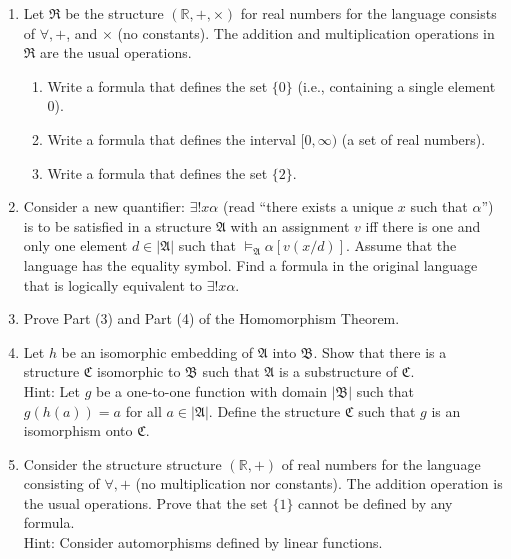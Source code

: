 \documentclass[12pt,letterpaper]{article}
\def\faA{\mathfrak{A}}
\def\faB{\mathfrak{B}}
\def\faC{\mathfrak{C}}
\begin{document}
\begin{enumerate}
\item
  Let $\mathfrak{R}$ be
  the structure $({\mathbb R}, +, \times)$ for real numbers
  for the language consists of $\forall, +$, and $\times$
  (no constants).
  The addition and multiplication operations in $\mathfrak{R}$
  are the usual operations.
  \vspace*{-2mm}
  \begin{enumerate}\itemsep 0pt
  \item
    Write a formula that defines the set $\{0\}$
    (i.e., containing a single element $0$).
  \item
    Write a formula that defines the interval $[0,\infty)$
    (a set of real numbers).
  \item
    Write a formula that defines the set $\{2\}$.
  \end{enumerate}

\item
  Consider a new quantifier: $\exists!x\alpha$
  (read ``there exists a unique $x$ such that $\alpha$'')
  is to be satisfied in a structure $\faA$ with an assignment $v$
  iff there is one and only one element $d\in|\faA|$ such that
  $\models_{\faA}\alpha[v(x/d)]$.
  Assume that the language has the equality symbol.
  Find a formula in the original language that
  is logically equivalent to $\exists!x\alpha$.

\item
  Prove Part (3) and Part (4) of the Homomorphism Theorem.

\item
  Let $h$ be an isomorphic embedding of $\faA$ into $\faB$.
  Show that there is a structure $\faC$ isomorphic to $\faB$
  such that $\faA$ is a substructure of $\faC$.\\
  Hint:
  Let $g$ be a one-to-one function with domain $|\faB|$  such that
  $g(h(a))=a$ for all $a\in|\faA|$.
  Define the structure $\faC$ such that
  $g$ is an isomorphism onto $\faC$.

\item
  Consider the structure structure $({\mathbb R}, +)$
  of real numbers for the language
  consisting of $\forall, +$ (no multiplication
  nor constants).
  The addition operation is the usual operations.
  Prove that the set $\{1\}$ cannot be defined by any formula.
  \\
  Hint: Consider automorphisms defined by linear functions.
\end{enumerate}
\end{document}
